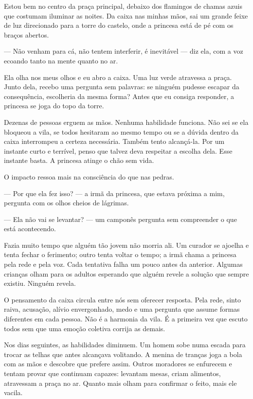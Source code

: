 Estou bem no centro da praça principal, debaixo dos flamingos de chamas azuis que costumam iluminar as noites. Da caixa nas minhas mãos, sai um grande feixe de luz direcionado para a torre do castelo, onde a princesa está de pé com os braços abertos.

— Não venham para cá, não tentem interferir, é inevitável — diz ela, com a voz ecoando tanto na mente quanto no ar.

Ela olha nos meus olhos e eu abro a caixa. Uma luz verde atravessa a praça. Junto dela, recebo uma pergunta sem palavras: se ninguém pudesse escapar da consequência, escolheria da mesma forma? Antes que eu consiga responder, a princesa se joga do topo da torre.

Dezenas de pessoas erguem as mãos. Nenhuma habilidade funciona. Não sei se ela bloqueou a vila, se todos hesitaram ao mesmo tempo ou se a dúvida dentro da caixa interrompeu a certeza necessária. Também tento alcançá-la. Por um instante curto e terrível, penso que talvez deva respeitar a escolha dela. Esse instante basta. A princesa atinge o chão sem vida.

O impacto ressoa mais na consciência do que nas pedras.

— Por que ela fez isso? — a irmã da princesa, que estava próxima a mim, pergunta com os olhos cheios de lágrimas.

— Ela não vai se levantar? — um camponês pergunta sem compreender o que está acontecendo.

Fazia muito tempo que alguém tão jovem não morria ali. Um curador se ajoelha e tenta fechar o ferimento; outro tenta voltar o tempo; a irmã chama a princesa pela rede e pela voz. Cada tentativa falha um pouco antes da anterior. Algumas crianças olham para os adultos esperando que alguém revele a solução que sempre existiu. Ninguém revela.

O pensamento da caixa circula entre nós sem oferecer resposta. Pela rede, sinto raiva, acusação, alívio envergonhado, medo e uma pergunta que assume formas diferentes em cada pessoa. Não é a harmonia da vila. É a primeira vez que escuto todos sem que uma emoção coletiva corrija as demais.

Nos dias seguintes, as habilidades diminuem. Um homem sobe numa escada para trocar as telhas que antes alcançava volitando. A menina de tranças joga a bola com as mãos e descobre que prefere assim. Outros moradores se enfurecem e tentam provar que continuam capazes: levantam mesas, criam alimentos, atravessam a praça no ar. Quanto mais olham para confirmar o feito, mais ele vacila.

